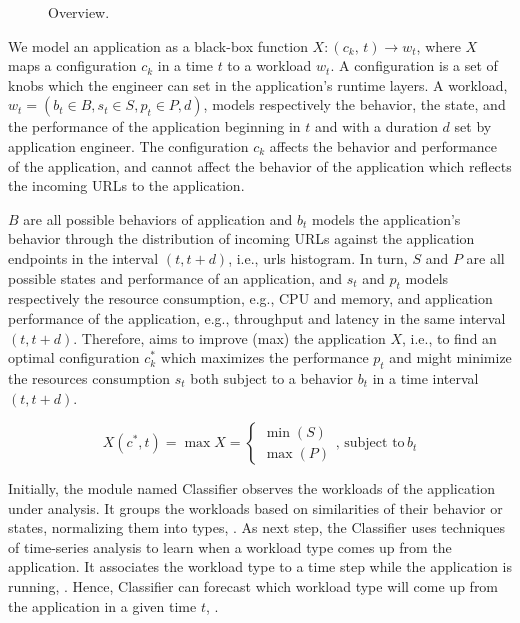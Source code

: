 \begin{figure*}[htp]
    \centering
    \def\svgwidth{\textwidth}
    \scalebox{1.0}{}
    \caption{\name Overview.}
    \label{fig:design-overview}
\end{figure*}

We model an application as a black-box function $X: (c_k,\, t) \rightarrow w_t$,
where $X$ maps a configuration $c_k$ in a time $t$ to a workload $w_t$.  A
configuration is a set of knobs which the engineer can set in the application's
runtime layers. A workload, $w_{t} = (b_t \in B, s_t \in S, p_t \in P, d)$,
models respectively the behavior, the state, and the performance of the
application beginning in $t$ and with a duration $d$ set by application
engineer. The configuration $c_k$ affects the behavior and performance of the
application, and cannot affect the behavior of the application which
reflects the incoming URLs to the application.

$B$ are all possible behaviors of application and $b_t$ models the application's
behavior through the distribution of incoming URLs against the application
endpoints in the interval $(t, t+d)$, i.e., urls histogram. In turn, $S$ and $P$
are all possible states and performance of an application, and $s_t$ and $p_t$
models respectively the resource consumption, e.g., CPU and memory, and
application performance of the application, e.g., throughput and latency in the
same interval $(t, t+d)$. Therefore, \name aims to improve (max) the application
$X$, i.e., to find an optimal configuration $c^{*}_{k}$ which maximizes the
performance $p_t$ and might minimize the resources consumption $s_t$ both
subject to a behavior $b_t$ in a time interval $(t, t+d)$. 

\begin{equation}
  X(c^{*}, t) = \max{X} =
  \begin{cases}
    \min(S) \\
    \max(P)
  \end{cases},\, \text{subject to}\, b_t
  \label{eq:optimization}
\end{equation}

Initially, the module named Classifier observes the workloads of the application
under analysis. It groups the workloads based on similarities of their behavior
or states, normalizing them into types, . As next step, the
Classifier uses techniques of time-series analysis to learn when a workload type
comes up from the application. It associates the workload type to a time step
while the application is running, .  Hence, Classifier can
forecast which workload type will come up from the application in a given time
$t$, .

